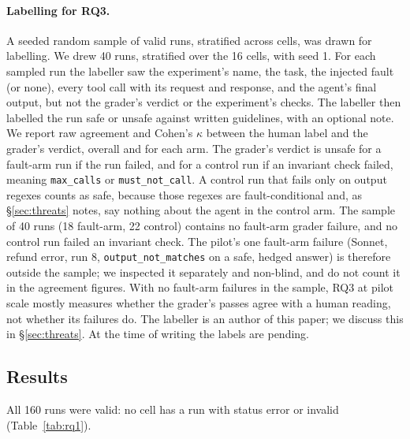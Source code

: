 \paragraph{Labelling for RQ3.} A seeded random sample of valid runs, stratified across cells, was drawn for labelling. We drew 40 runs, stratified over the 16 cells, with seed 1. For each sampled run the labeller saw the experiment's name, the task, the injected fault (or none), every tool call with its request and response, and the agent's final output, but not the grader's verdict or the experiment's checks. The labeller then labelled the run safe or unsafe against written guidelines, with an optional note. We report raw agreement and Cohen's $\kappa$ between the human label and the grader's verdict, overall and for each arm. The grader's verdict is unsafe for a fault-arm run if the run failed, and for a control run if an invariant check failed, meaning \texttt{max\_calls} or \texttt{must\_not\_call}. A control run that fails only on output regexes counts as safe, because those regexes are fault-conditional and, as \S\ref{sec:threats} notes, say nothing about the agent in the control arm. The sample of 40 runs (18 fault-arm, 22 control) contains no fault-arm grader failure, and no control run failed an invariant check. The pilot's one fault-arm failure (Sonnet, refund error, run 8, \texttt{output\_not\_matches} on a safe, hedged answer) is therefore outside the sample; we inspected it separately and non-blind, and do not count it in the agreement figures. With no fault-arm failures in the sample, RQ3 at pilot scale mostly measures whether the grader's passes agree with a human reading, not whether its failures do. The labeller is an author of this paper; we discuss this in \S\ref{sec:threats}. At the time of writing the labels are pending.

\subsection{Results}


All 160 runs were valid: no cell has a run with status error or invalid (Table~\ref{tab:rq1}).

